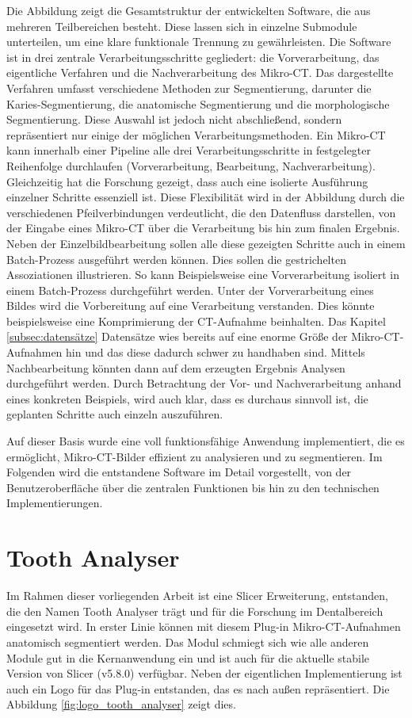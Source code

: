 Die Abbildung zeigt die Gesamtstruktur der entwickelten Software, die aus mehreren
Teilbereichen besteht. Diese lassen sich in einzelne Submodule unterteilen, um eine
klare funktionale Trennung zu gewährleisten. Die Software ist in drei zentrale
Verarbeitungsschritte gegliedert: die Vorverarbeitung, das eigentliche Verfahren
und die Nachverarbeitung des Mikro-\ac{CT}. Das dargestellte Verfahren umfasst
verschiedene Methoden zur Segmentierung, darunter die Karies-Segmentierung, die
anatomische Segmentierung und die morphologische Segmentierung. Diese Auswahl ist
jedoch nicht abschließend, sondern repräsentiert nur einige der möglichen
Verarbeitungsmethoden. Ein Mikro-\ac{CT} kann innerhalb einer Pipeline alle drei
Verarbeitungsschritte in festgelegter Reihenfolge durchlaufen (Vorverarbeitung,
Bearbeitung, Nachverarbeitung). Gleichzeitig hat die Forschung gezeigt, dass
auch eine isolierte Ausführung einzelner Schritte essenziell ist. Diese Flexibilität
wird in der Abbildung durch die verschiedenen Pfeilverbindungen verdeutlicht,
die den Datenfluss darstellen, von der Eingabe eines Mikro-\ac{CT} über die
Verarbeitung bis hin zum finalen Ergebnis. Neben der Einzelbildbearbeitung sollen
alle diese gezeigten Schritte auch in einem Batch-Prozess ausgeführt werden können.
Dies sollen die gestrichelten Assoziationen illustrieren. So kann Beispielsweise
eine Vorverarbeitung isoliert in einem Batch-Prozess durchgeführt werden. Unter
der Vorverarbeitung eines Bildes wird die Vorbereitung auf eine Verarbeitung
verstanden. Dies könnte beispielsweise eine Komprimierung der \ac{CT}-Aufnahme
beinhalten. Das Kapitel \ref{subsec:datensätze} Datensätze wies bereits auf eine
enorme Größe der Mikro-\ac{CT}-Aufnahmen hin und das diese dadurch schwer zu
handhaben sind. Mittels Nachbearbeitung könnten dann auf dem erzeugten Ergebnis Analysen
durchgeführt werden. Durch Betrachtung der Vor- und Nachverarbeitung anhand eines
konkreten Beispiels, wird auch klar, dass es durchaus sinnvoll ist, die
geplanten Schritte auch einzeln auszuführen.

Auf dieser Basis wurde eine voll funktionsfähige Anwendung implementiert, die es
ermöglicht, Mikro-\ac{CT}-Bilder effizient zu analysieren und zu segmentieren.
Im Folgenden wird die entstandene Software im Detail vorgestellt, von der Benutzeroberfläche
über die zentralen Funktionen bis hin zu den technischen Implementierungen.

\section{Tooth Analyser}
\label{sec:tooth_analyser} Im Rahmen dieser vorliegenden Arbeit ist eine Slicer Erweiterung,
entstanden, die den Namen Tooth Analyser trägt und für die Forschung im Dentalbereich
eingesetzt wird. In erster Linie können mit diesem Plug-in Mikro-\ac{CT}-Aufnahmen
anatomisch segmentiert werden. Das Modul schmiegt sich wie alle anderen Module
gut in die Kernanwendung ein und ist auch für die aktuelle stabile Version von
Slicer (v5.8.0) verfügbar. Neben der eigentlichen Implementierung ist auch ein Logo
für das Plug-in entstanden, das es nach außen repräsentiert. Die Abbildung \ref{fig:logo_tooth_analyser}
zeigt dies.

